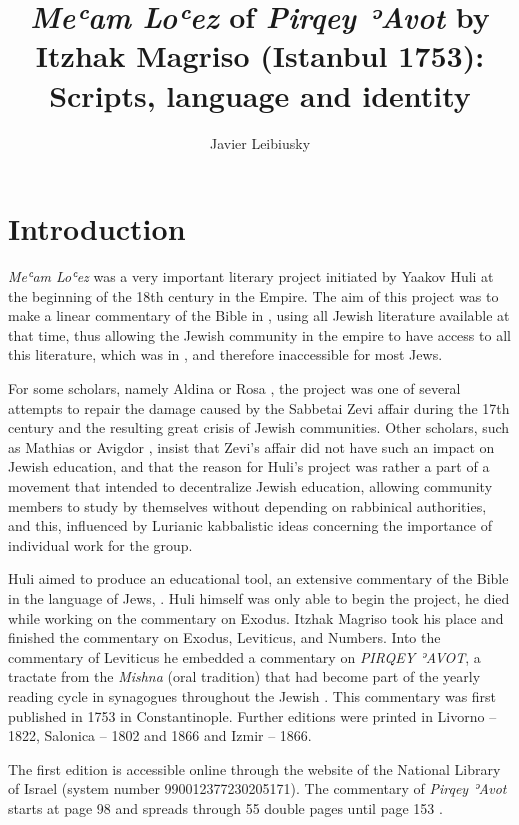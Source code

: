 \documentclass[output=paper,colorlinks,citecolor=brown,babel,arabicfont]{langscibook}
\author{Javier Leibiusky\orcid{}\affiliation{LOEWE (Goethe Universität) and CERMOM (INALCO)}}
\title[{\textit{Meʿam Loʿez} of \textit{Pirqey ʾAvot} by Itzhak Magriso (Istanbul 1753)}]{{\textit{Meʿam Loʿez} of \textit{Pirqey ʾAvot} by Itzhak Magriso (Istanbul 1753): Scripts, language and identity}}
\begin{document}
\maketitle

\section{Introduction}\label{ch3.7.ss.1}

\textit{Meʿam Loʿez} was a very important literary project initiated by Yaakov Huli at the beginning of the 18th century in the  Empire. The aim of this project was to make a linear commentary of the Bible in , using all Jewish literature available at that time, thus allowing the Jewish community in the  empire to have access to all this literature, which was in , and therefore inaccessible for most  Jews.
\largerpage[2]

For some scholars, namely Aldina \citet{quintana2006} or Rosa \citet{asenjo2003}, the project was one of several attempts to repair the damage caused by the Sabbetai Zevi affair during the 17th century and the resulting great crisis of Jewish communities. Other scholars, such as Mathias \citet{lehmann2014} or Avigdor \citet{levy1992}, insist that Zevi's affair did not have such an impact on Jewish education, and that the reason for Huli's project was rather a part of a movement that intended to decentralize Jewish education, allowing community members to study by themselves without depending on rabbinical authorities, and this, influenced by Lurianic kabbalistic ideas concerning the importance of individual work for the group.


Huli aimed to produce an educational tool, an extensive commentary of the Bible in the language of  Jews, . Huli himself was only able to begin the project, he died while working on the commentary on Exodus. Itzhak Magriso took his place and finished the commentary on Exodus, Leviticus, and Numbers. Into the commentary of Leviticus he embedded a commentary on \textit{PIRQEY ʾAVOT}, a tractate from the \textit{Mishna} (oral tradition) that had become part of the yearly reading cycle in synagogues throughout the Jewish . This commentary was first published in 1753 in Constantinople. Further editions were printed in Livorno -- 1822, Salonica -- 1802 and 1866 and Izmir -- 1866.


The first edition is accessible online through the website of the National Library of Israel (system number 990012377230205171). The commentary of \textit{Pirqey ʾAvot} starts at page 98 and spreads through 55 double pages until page 153 \citep{magriso1753}. 
\end{document}
